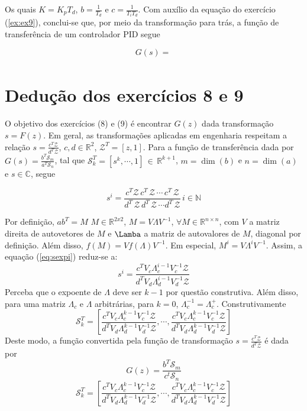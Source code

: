 \documentclass{article}
\begin{document}
Os quais $K = K_p T_d $, $b = \frac{1}{T_d}$ e $c = \frac{1}{T_i T_d}$. Com auxílio da equação do exercício (\ref{ex:ex9}), conclui-se que, por meio da transformação para trás, a função de transferência de um controlador PID segue

\begin{equation}
G(s) = \frac{}{}
\end{equation}

\section*{Dedução dos exercícios 8 e 9}
\label{sec:deducao89}

O objetivo dos exercícios (8) e (9) é encontrar $G(z)$ dada transformação $s = F(z)$. Em geral, as transformações aplicadas em engenharia respeitam a relação $s = \frac{c^T \mathcal{Z}}{d^T \mathcal{Z}}$, $c, d \in \mathbb{R}^2$, $\mathcal{Z}^T = [z, 1] $. Para a função de transferência dada por $G(s) = \frac{b^T \mathcal{S}_m}{a^T \mathcal{S}_n}$, tal que $\mathcal{S}_k^T = [s^k, \cdots, 1]  \, \in \, \mathbb{R}^{k+1}$, $m = \dim(b)$ e $n = \dim(a)$ e $s \in \mathbb{C}$, segue

\begin{equation}
s^i = \frac{c^T \mathcal{Z} \, c^T \, \mathcal{Z} \, \cdots \, c^T \, \mathcal{Z}}{d^T \, \mathcal{Z} \, d^T \, \mathcal{Z} \, \cdots d^T \, \mathcal{Z}} \, i \in \mathbb{N}
\label{eq:sexpi}
\end{equation}

Por definição, $a b^T = M \,\, M \in \mathbb{R}^{2x2}$, $M = V \Lambda V^{-1}$, $\forall M \in \mathbb{R}^{n \times n}$, com $V$ a matriz direita de autovetores de $M$ e $\Lamba$ a matriz de autovalores de $M$, diagonal por definição. Além disso, $f(M) = V f(\Lambda) V^{-1}$. Em especial, $M^i = V \Lambda^i V^{-1}$. Assim, a equação (\ref{eq:sexpi}) reduz-se a:
\begin{equation}
s^i = \frac{c^T V_c \Lambda_c^{i-1} V_c^{-1} \mathcal{Z}}{d^T V_d \Lambda_d^{i-1} V_d^{-1} \mathcal{Z}}
\end{equation}
Perceba que o expoente de $\Lambda$ deve ser $k - 1$ por questão construtiva. Além disso, para uma matriz $\Lambda_c$ e $\Lambda$ arbitrárias, para $k = 0$, $\Lambda_c^{-1} = \Lambda_c^{+}$. Construtivamente
\begin{equation}
\mathcal{S}_k^T = \left[\frac{c^T V_c \Lambda_c^{k-1} V_c^{-1} \mathcal{Z}}{d^T V_d \Lambda_d^{k-1} V_d^{-1} \mathcal{Z}}, \cdots, \frac{c^T V_c \Lambda_c^{k-1} V_c^{-1} \mathcal{Z}}{d^T V_d \Lambda_d^{k-1} V_d^{-1} \mathcal{Z}}\right]
\end{equation}
Deste modo, a função convertida pela função de transformação $s = \frac{c^T \mathcal{Z}}{d^T \mathcal{Z}}$ é dada por
\begin{equation}
G(z) = \frac{b^T \mathcal{S}_m}{c^t \mathcal{S}_n}    
\end{equation}
\begin{equation}
\mathcal{S}_k^T = \left[\frac{c^T V_c \Lambda_c^{k-1} V_c^{-1} \mathcal{Z}}{d^T V_d \Lambda_d^{k-1} V_d^{-1} \mathcal{Z}}, \cdots, \frac{c^T V_c \Lambda_c^{k-1} V_c^{-1} \mathcal{Z}}{d^T V_d \Lambda_d^{k-1} V_d^{-1} \mathcal{Z}}\right]
\end{equation}
\end{document}
